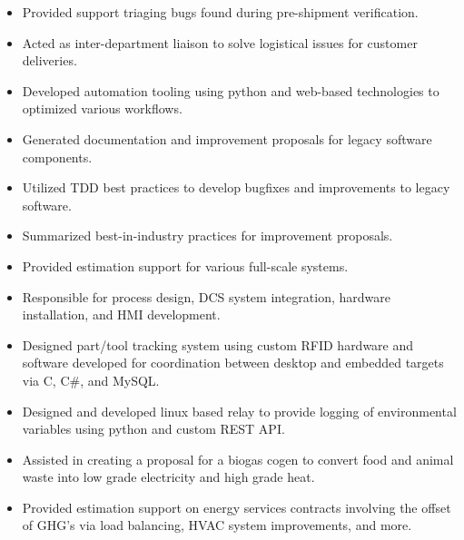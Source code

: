 \documentclass[a4paper,ragged2e,withhyper]{altacv}
\begin{document}
\divider


\begin{itemize}
\item Provided support triaging bugs found during pre-shipment verification.\\
\item Acted as inter-department liaison to solve logistical issues for customer deliveries.\\
\item Developed automation tooling using python and web-based technologies to optimized various workflows.\\
\item Generated documentation and improvement proposals for legacy software components.\\
\item Utilized TDD best practices to develop bugfixes and improvements to legacy software.\\
\end{itemize}

\divider


\begin{itemize}
\item Summarized best-in-industry practices for improvement proposals.\\
\item Provided estimation support for various full-scale systems.\\
\item Responsible for process design, DCS system integration, hardware installation, and HMI development.\\
\item Designed part/tool tracking system using custom RFID hardware and software developed for coordination between desktop and embedded targets via C, C\#, and MySQL.\\
\end{itemize}

\divider


\begin{itemize}
\item Designed and developed linux based relay to provide logging of environmental variables using python and custom REST API.\\
\item Assisted in creating a proposal for a biogas cogen to convert food and animal waste into low grade electricity and high grade heat.\\
\item Provided estimation support on energy services contracts involving the offset of GHG's via load balancing, HVAC system improvements, and more.\\
\end{itemize}
\end{document}
